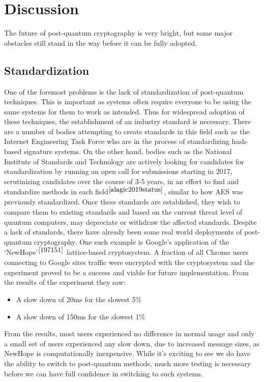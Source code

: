 \documentclass[10pt,a4paper]{IEEEtran}
\begin{document}
\section{Discussion}
The future of post-quantum cryptography is very bright, but some major obstacles still stand in the way before it can be fully adopted.

\subsection{Standardization}
One of the foremost problems is the lack of standardization of post-quantum techniques. This is important as systems often require everyone to be using the same systems for them to work as intended. Thus for widespread adoption of these techniques, the establishment of  an industry standard is necessary. There are a number of bodies attempting to create standards in this field such as the Internet Engineering Task Force who are in the process of standardizing hash-based signature systems. On the other hand, bodies such as the National Institute of Standards and Technology are actively looking for candidates for standardization by running an open call for submissions starting in 2017, scrutinizing candidates over the course of 3-5 years, in an effort to find and standardize methods in each field\(^{\cite{alagic2019status}}\), similar to how AES was previously standardized. Once these standards are established, they wish to compare them to existing standards and based on the current threat level of quantum computers, may depreciate or withdraw the affected standards. 
\newline
Despite a lack of standards, there have already been some real world deployments of post-quantum cryptography. One such example is Google's application of the `NewHope'\(^{\cite{197151}}\) lattice-based cryptosystem. A fraction of all Chrome users connecting to Google sites traffic were encrypted with the cryptosystem and the experiment proved to be a success and viable for future implementation. From the results of the experiment they saw: 
\begin{itemize}
\item A slow down of 20ms for the slowest 5\% 
\item A slow down of 150ms for the slowest 1\%
\end{itemize}
From the results, most users experienced no difference in normal usage and only a small set of users experienced any slow down, due to increased message sizes, as NewHope is computationally inexpensive.
\newline
While it's exciting to see we do have the ability to switch to post-quantum methods, much more testing is necessary before we can have full confidence in switching to such systems. 
\end{document}
